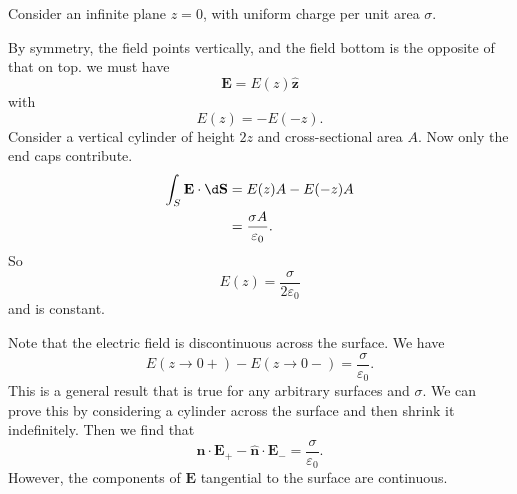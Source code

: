\documentclass[a4paper]{article}
\begin{document}
\begin{eg}
  Consider an infinite plane $z = 0$, with uniform charge per unit area $\sigma$.
  \begin{center}
  \end{center}
  By symmetry, the field points vertically, and the field bottom is the opposite of that on top. we must have
  \[
    \mathbf{E} = E(z)\hat{\mathbf{z}}
  \]
  with
  \[
    E(z) = -E(-z).
  \]
  Consider a vertical cylinder of height $2z$ and cross-sectional area $A$. Now only the end caps contribute.
  \begin{align*}
    \int_S \mathbf{E} \cdot \d \mathbf{S} &= E(z) A - E(-z) A\\
    &=\frac{\sigma A}{\varepsilon _0}.
  \end{align*}
  So
  \[
    E(z) = \frac{\sigma }{2\varepsilon_0}
  \]
  and is constant.

  Note that the electric field is discontinuous across the surface. We have
  \[
    E(z\to 0+) - E(z\to 0-) = \frac{\sigma}{\varepsilon_0}.
  \]
  This is a general result that is true for any arbitrary surfaces and $\sigma$. We can prove this by considering a cylinder across the surface and then shrink it indefinitely. Then we find that
  \[
    \hat{\mathbf{n}}\cdot \mathbf{E}_+ - \hat{\mathbf{n}}\cdot \mathbf{E}_- = \frac{\sigma}{\varepsilon_0}.
  \]
  However, the components of $\mathbf{E}$ tangential to the surface are continuous.
\end{eg}
\end{document}
